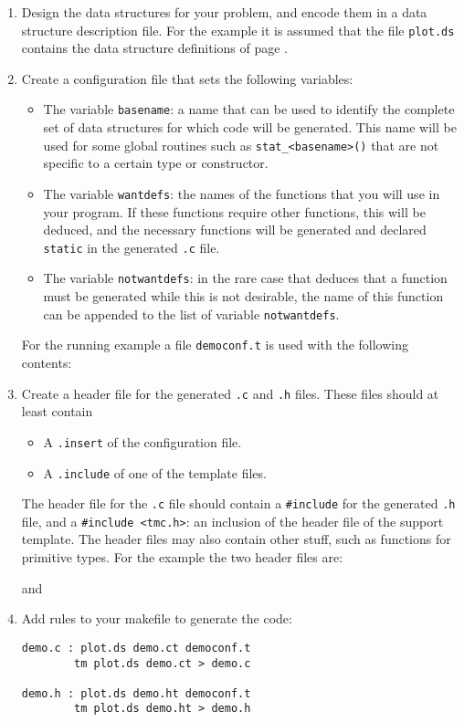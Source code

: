 \begin{enumerate}
\item
Design the data structures for your problem,
and encode them in a data structure description file.
For the example it is assumed that the file {\tt plot.ds} contains the
data structure definitions of page \pageref{plotds}.
\item
Create a configuration file that sets the following {\Tm} variables:
\begin{itemize}
\item
The variable {\tt basename}:
a name that can be used to identify the complete set of data structures
for which code will be generated. This name will be used for some global
routines such as \verb'stat_<basename>()' that are not specific to
a certain type or constructor.
\item
The variable {\tt wantdefs}: the names of the functions that you
will use in your program.
If these functions require other functions,
this will be deduced, and the necessary functions will be generated and
declared {\tt static} in the generated {\tt .c} file.
\item
The variable {\tt notwantdefs}:
in the rare case that {\Tm} deduces that a function must be generated
while this is not desirable,
the name of this function can be appended to the list of
variable {\tt notwantdefs}.
\end{itemize}
For the running example a file {\tt democonf.t} is used with the
following contents:
\begin{listing}

\end{listing}
\item
Create a {\Tm} header file for the generated {\tt .c} and {\tt .h}
files.
These files should at least contain
\begin{itemize}
\item
A {\tt .insert} of the configuration file.
\item
A {\tt .include} of one of the template files.
\end{itemize}
The header file for the {\tt .c} file should contain a {\tt \#include}
for the generated {\tt .h} file,
and a {\tt \#include <tmc.h>}: an inclusion of the header file of the
{\C} support template.
The header files may also contain other stuff,
such as functions for primitive types.
For the example the two header files are:
\begin{listing}

\end{listing}
and
\begin{listing}

\end{listing}
\item
Add rules to your makefile to generate the code:
\begin{listing}
\begin{verbatim}
demo.c : plot.ds demo.ct democonf.t
        tm plot.ds demo.ct > demo.c

demo.h : plot.ds demo.ht democonf.t
        tm plot.ds demo.ht > demo.h
\end{verbatim}
\end{listing}
\end{enumerate}
